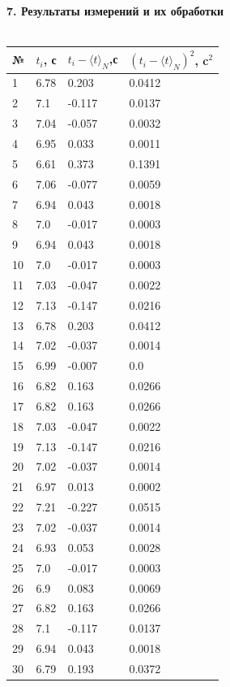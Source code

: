 \documentclass[14pt]{article}
\begin{document}
	\textbf{7. Результаты измерений и их обработки} \\ \\
	\begin{tabular}{|p{1cm}|p{5cm}|p{5cm}|p{5cm}|}
		\hline
		№ & $t_i$, с & $t_i -\langle t \rangle_N$,с & $(t_i-\langle t \rangle_N)^2$, c$^2$ \\
\hline
1 & 6.78 & 0.203 & 0.0412 \\
\hline
2 & 7.1 & -0.117 & 0.0137 \\
\hline
3 & 7.04 & -0.057 & 0.0032 \\
\hline
4 & 6.95 & 0.033 & 0.0011 \\
\hline
5 & 6.61 & 0.373 & 0.1391 \\
\hline
6 & 7.06 & -0.077 & 0.0059 \\
\hline
7 & 6.94 & 0.043 & 0.0018 \\
\hline
8 & 7.0 & -0.017 & 0.0003 \\
\hline
9 & 6.94 & 0.043 & 0.0018 \\
\hline
10 & 7.0 & -0.017 & 0.0003 \\
\hline
11 & 7.03 & -0.047 & 0.0022 \\
\hline
12 & 7.13 & -0.147 & 0.0216 \\
\hline
13 & 6.78 & 0.203 & 0.0412 \\
\hline
14 & 7.02 & -0.037 & 0.0014 \\
\hline
15 & 6.99 & -0.007 & 0.0 \\
\hline
16 & 6.82 & 0.163 & 0.0266 \\
\hline
17 & 6.82 & 0.163 & 0.0266 \\
\hline
18 & 7.03 & -0.047 & 0.0022 \\
\hline
19 & 7.13 & -0.147 & 0.0216 \\
\hline
20 & 7.02 & -0.037 & 0.0014 \\
\hline
21 & 6.97 & 0.013 & 0.0002 \\
\hline
22 & 7.21 & -0.227 & 0.0515 \\
\hline
23 & 7.02 & -0.037 & 0.0014 \\
\hline
24 & 6.93 & 0.053 & 0.0028 \\
\hline
25 & 7.0 & -0.017 & 0.0003 \\
\hline
26 & 6.9 & 0.083 & 0.0069 \\
\hline
27 & 6.82 & 0.163 & 0.0266 \\
\hline
28 & 7.1 & -0.117 & 0.0137 \\
\hline
29 & 6.94 & 0.043 & 0.0018 \\
\hline
30 & 6.79 & 0.193 & 0.0372 \\

\end{tabular}
\end{document}
